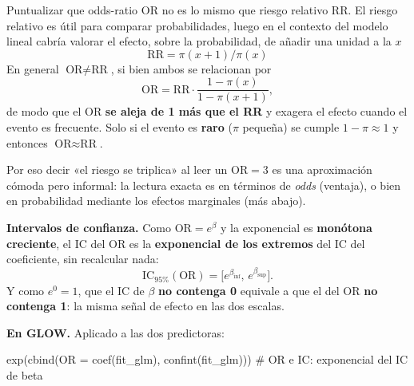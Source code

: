 \documentclass[
  letterpaper,
  DIV=11,
  numbers=noendperiod]{scrartcl}
\newenvironment{Shaded}{\begin{snugshade}}{\end{snugshade}}
\newcommand{\AttributeTok}[1]{\textcolor[rgb]{0.40,0.45,0.13}{#1}}
\newcommand{\CommentTok}[1]{\textcolor[rgb]{0.37,0.37,0.37}{#1}}
\newcommand{\FunctionTok}[1]{\textcolor[rgb]{0.28,0.35,0.67}{#1}}
\newcommand{\NormalTok}[1]{\textcolor[rgb]{0.00,0.23,0.31}{#1}}
\begin{document}
\begin{tcolorbox}[enhanced jigsaw, breakable, colframe=quarto-callout-warning-color-frame, left=2mm, arc=.35mm, colbacktitle=quarto-callout-warning-color!10!white, toprule=.15mm, colback=white, coltitle=black, rightrule=.15mm, opacitybacktitle=0.6, title=\textcolor{quarto-callout-warning-color}{\faExclamationTriangle}\hspace{0.5em}{Odds ratio y riesgo relativo}, titlerule=0mm, toptitle=1mm, bottomtitle=1mm, leftrule=.75mm, bottomrule=.15mm, opacityback=0]

Puntualizar que odds-ratio OR no es lo mismo que riesgo relativo RR. El
riesgo relativo es útil para comparar probabilidades, luego en el
contexto del modelo lineal cabría valorar el efecto, sobre la
probabilidad, de añadir una unidad a la \(x\)
\[\text{RR}=\pi(x+1)/\pi(x)\] En general \(\text{OR}\neq\text{RR}\), si
bien ambos se relacionan por \[
\text{OR}=\text{RR}\cdot\frac{1-\pi(x)}{1-\pi(x+1)},
\] de modo que el OR \textbf{se aleja de 1 más que el RR} y exagera el
efecto cuando el evento es frecuente. Solo si el evento es \textbf{raro}
(\(\pi\) pequeña) se cumple \(1-\pi\approx 1\) y entonces
\(\text{OR}\approx\text{RR}\).

Por eso decir «el riesgo se triplica» al leer un \(\text{OR}=3\) es una
aproximación cómoda pero informal: la lectura exacta es en términos de
\emph{odds} (ventaja), o bien en probabilidad mediante los efectos
marginales (más abajo).

\end{tcolorbox}

\textbf{Intervalos de confianza.} Como \(\text{OR}=e^{\beta}\) y la
exponencial es \textbf{monótona creciente}, el IC del OR es la
\textbf{exponencial de los extremos} del IC del coeficiente, sin
recalcular nada:
\[\text{IC}_{95\%}(\text{OR})=\big[e^{\beta_{\text{inf}}},\,e^{\beta_{\text{sup}}}\big].\]
Y como \(e^{0}=1\), que el IC de \(\beta\) \textbf{no contenga 0}
equivale a que el del OR \textbf{no contenga 1}: la misma señal de
efecto en las dos escalas.

\textbf{En GLOW.} Aplicado a las dos predictoras:

\begin{Shaded}
\begin{Highlighting}[]
\FunctionTok{exp}\NormalTok{(}\FunctionTok{cbind}\NormalTok{(}\AttributeTok{OR =} \FunctionTok{coef}\NormalTok{(fit\_glm), }\FunctionTok{confint}\NormalTok{(fit\_glm)))   }\CommentTok{\# OR e IC: exponencial del IC de beta}
\end{Highlighting}
\end{Shaded}
\end{document}
